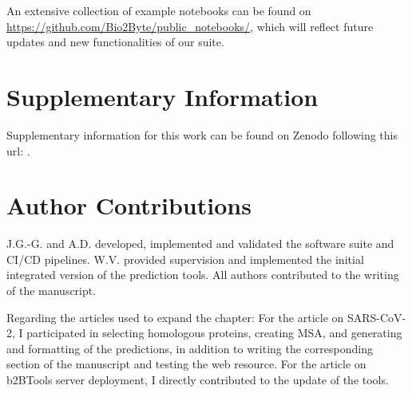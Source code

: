 An extensive collection of example notebooks can be found on \url{https://github.com/Bio2Byte/public_notebooks/}, which will reflect future updates and new functionalities of our suite.

\section*{Supplementary Information}
Supplementary information for this work can be found on Zenodo following this url: .

\section*{Author Contributions}
J.G.-G. and A.D. developed, implemented and validated the software suite and CI/CD pipelines.
W.V. provided supervision and implemented the initial integrated version of the prediction tools.
All authors contributed to the writing of the manuscript.

Regarding the articles used to expand the chapter: For the article on SARS-CoV-2, I participated in selecting homologous proteins, creating MSA, and generating and formatting of the predictions, in addition to writing the corresponding section of the manuscript and testing the web resource. For the article on b2BTools server deployment, I directly contributed to the update of the tools.



